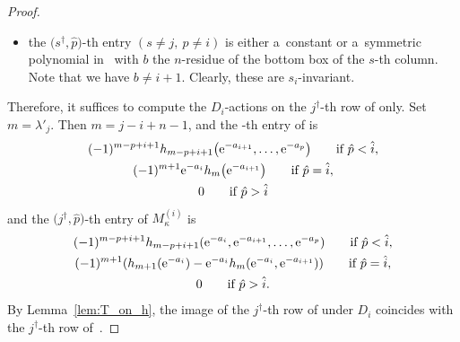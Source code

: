\documentclass[10pt,a4paper]{amsart}
\numberwithin{equation}{section}
\theoremstyle{definition}
\begin{document}
\begin{proof}
\begin{itemize}
\item the $\bigl(s^\dagger,\hat{p}\bigr)$-th entry $(s\neq j,\ p\neq i)$ is either a~constant or a~symmetric polynomial in~ with $b$ the $n$-residue of the bottom box of
the $s$-th column. Note that we have $b\ne i+1$.
Clearly, these are $s_i$-invariant.
\end{itemize}
Therefore, it suffices to compute the $D_i$-actions on the $j^\dagger$-th row of  only.
Set
$m=\lambda'_j$.
Then
$m=j-i+n-1$,
and the -th entry of  is
\begin{gather*}
(-1)^{m-p+i+1}h_{m-p+i+1}\bigl({\rm e}^{-a_{i+1}},\dots,{\rm e}^{-a_p}\bigr) \qquad \text{if} \ \hat{p}<\hat{i},\\
(-1)^{m+1}{\rm e}^{-a_i}h_{m}\bigl({\rm e}^{-a_{i+1}}\bigr) \qquad \text{if} \ \hat{p}=\hat{i},\\
0 \qquad \text{if} \ \hat{p}>\hat{i}
\end{gather*}
and the $\bigl(j^\dagger,\hat{p}\bigr)$-th entry of $M^{(i)}_\kappa$ is
\begin{gather*}
(-1)^{m-p+i+1}h_{m-p+i+1}({\rm e}^{-a_i},{\rm e}^{-a_{i+1}},\dots,{\rm e}^{-a_p}) \qquad \text{if} \
\hat{p}<\hat{i},\\
(-1)^{m+1}
(
h_{m+1}({\rm e}^{-a_i})
-{\rm e}^{-a_i}h_{m}({\rm e}^{-a_i},{\rm e}^{-a_{i+1}})
) \qquad \text{if} \  \hat{p}=\hat{i},\\
0   \qquad \text{if} \ \hat{p}>\hat{i}.
\end{gather*}
By Lemma~\ref{lem:T_on_h}, the image of the $j^\dagger$-th row of  under $D_i$ coincides with the $j^\dagger$-th row of~.
\end{proof}
\end{document}
